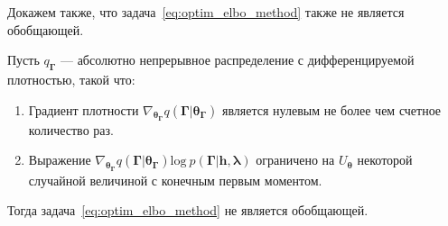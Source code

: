 Докажем также, что задача~\eqref{eq:optim_elbo_method} также не является обобщающей.
\begin{theorem}
Пусть $q_{\boldsymbol{\Gamma}}$ --- абсолютно непрерывное распределение с дифференцируемой плотностью, такой что:
\begin{enumerate}
\item Градиент плотности $\nabla_{\boldsymbol{\theta}_{\boldsymbol{\Gamma}}} q(\boldsymbol{\Gamma}|\boldsymbol{\theta}_{\boldsymbol{\Gamma}})$ является нулевым не более чем счетное количество раз. 
\item Выражение $\nabla_{\boldsymbol{\theta}_{\boldsymbol{\Gamma}}} q(\boldsymbol{\Gamma}|\boldsymbol{\theta}_{\boldsymbol{\Gamma}}) \text{log}~p(\boldsymbol{\Gamma}|\mathbf{h}, \boldsymbol{\lambda})$ ограничено на $U_{\boldsymbol{\theta}}$ некоторой случайной величиной с конечным первым моментом.
\end{enumerate}
Тогда задача~\eqref{eq:optim_elbo_method} не является обобщающей.
\end{theorem}
